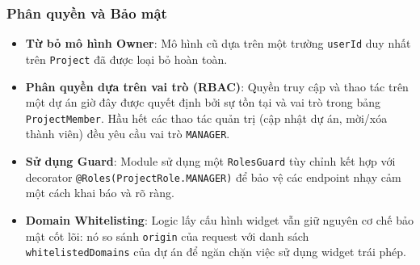 \subsubsection{Phân quyền và Bảo mật}
\begin{itemize}
    \item \textbf{Từ bỏ mô hình Owner}: Mô hình cũ dựa trên một trường \texttt{userId} duy nhất trên \texttt{Project} đã được loại bỏ hoàn toàn.
    \item \textbf{Phân quyền dựa trên vai trò (RBAC)}: Quyền truy cập và thao tác trên một dự án giờ đây được quyết định bởi sự tồn tại và vai trò trong bảng \texttt{ProjectMember}. Hầu hết các thao tác quản trị (cập nhật dự án, mời/xóa thành viên) đều yêu cầu vai trò \texttt{MANAGER}.
    \item \textbf{Sử dụng Guard}: Module sử dụng một \texttt{RolesGuard} tùy chỉnh kết hợp với decorator \texttt{@Roles(ProjectRole.MANAGER)} để bảo vệ các endpoint nhạy cảm một cách khai báo và rõ ràng.
    \item \textbf{Domain Whitelisting}: Logic lấy cấu hình widget vẫn giữ nguyên cơ chế bảo mật cốt lõi: nó so sánh \texttt{origin} của request với danh sách \texttt{whitelistedDomains} của dự án để ngăn chặn việc sử dụng widget trái phép.
\end{itemize}